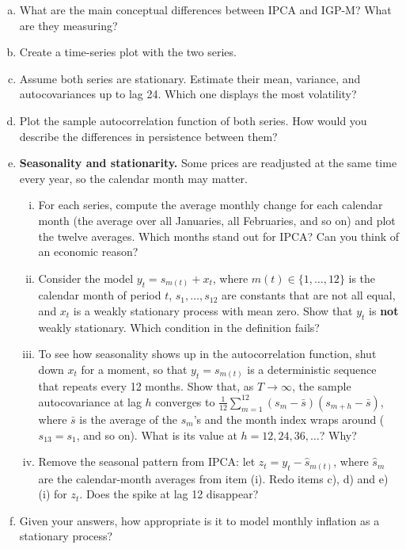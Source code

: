 \documentclass[11pt]{article}
\theoremstyle{definition}
\begin{document}
\begin{enumerate}[a)]
	\item What are the main conceptual differences between IPCA and IGP-M? What are they measuring?
	\item Create a time-series plot with the two series.
	\item Assume both series are stationary. Estimate their mean, variance, and autocovariances up to lag 24. Which one displays the most volatility?
	\item Plot the sample autocorrelation function of both series. How would you describe the differences in persistence between them?
	\item \textbf{Seasonality and stationarity.} Some prices are readjusted at the same time every year, so the calendar month may matter.
	\begin{enumerate}[(i)]
		\item For each series, compute the average monthly change for each calendar month (the average over all Januaries, all Februaries, and so on) and plot the twelve averages. Which months stand out for IPCA? Can you think of an economic reason?
		\item Consider the model $y_t = s_{m(t)} + x_t$, where $m(t) \in \{1, \dots, 12\}$ is the calendar month of period $t$, $s_1, \dots, s_{12}$ are constants that are not all equal, and $x_t$ is a weakly stationary process with mean zero. Show that $y_t$ is \textbf{not} weakly stationary. Which condition in the definition fails?
		\item To see how seasonality shows up in the autocorrelation function, shut down $x_t$ for a moment, so that $y_t = s_{m(t)}$ is a deterministic sequence that repeats every 12 months. Show that, as $T \to \infty$, the sample autocovariance at lag $h$ converges to $\frac{1}{12}\sum_{m=1}^{12}(s_m - \bar{s})(s_{m+h} - \bar{s})$, where $\bar{s}$ is the average of the $s_m$'s and the month index wraps around ($s_{13} = s_1$, and so on). What is its value at $h = 12, 24, 36, \dots$? Why?
		\item Remove the seasonal pattern from IPCA: let $z_t = y_t - \hat{s}_{m(t)}$, where $\hat{s}_m$ are the calendar-month averages from item (i). Redo items c), d) and e)(i) for $z_t$. Does the spike at lag 12 disappear?
	\end{enumerate}

	\item Given your answers, how appropriate is it to model monthly inflation as a stationary process?
	\end{enumerate}
\end{document}
